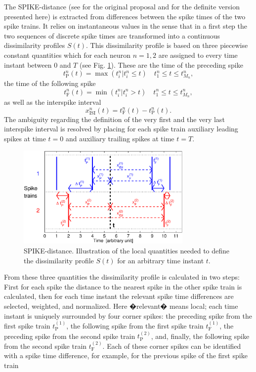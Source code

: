 \documentclass[10pt,twocolumn]{elsart5p}
\begin{document}
The SPIKE-distance (see \citet{Kreuz11} for the original proposal and \citet{Kreuz13} for the definite version presented here) is extracted from differences between the spike times of the two spike trains. It relies on instantaneous values in the sense that in a first step the two sequences of discrete spike times are transformed into a continuous dissimilarity profiles $S (t)$. This dissimilarity profile is based on three piecewise constant quantities which for each neuron $n = 1, 2$ are assigned to every time instant between $0$ and $T$ (see Fig. \ref{fig:Fig1-SPIKE-Illustration}). These are the time of the preceding spike
%
\begin{equation} \label{eq:Prev-Spike}
    t_{\mathrm {P}}^n (t) = \max(t_i^n | t_i^n \leq t)  \quad t_1^n \leq t \leq t_{M_n}^n,
\end{equation}
%
the time of the following spike
%
\begin{equation} \label{eq:Foll-Spike}
    t_{\mathrm {F}}^n (t) = \min(t_i^n | t_i^n > t)  \quad t_1^n \leq t \leq t_{M_n}^n,
\end{equation}
%
as well as the interspike interval
%
\begin{equation} \label{eq:ISI}
    x_{\mathrm {ISI}}^n (t) = t_{\mathrm {F}}^n (t) - t_{\mathrm {P}}^n (t).
\end{equation}
%
The ambiguity regarding the definition of the very first and the very last interspike interval is resolved by placing for each spike train auxiliary leading spikes at time $t = 0$ and auxiliary trailing spikes at time $t = T$.
%
\begin{figure}
    \includegraphics[width=85mm]{Fig1_SPIKE_Illustration.eps}
    \caption{\abb\label{fig:Fig1-SPIKE-Illustration} SPIKE-distance. Illustration of the local quantities needed to define the dissimilarity profile $S (t)$ for an arbitrary time instant $t$.}
\end{figure}
%
From these three quantities the dissimilarity profile is calculated in two steps: First for each spike the distance to the nearest spike in the other spike train is calculated, then for each time instant the relevant spike time differences are selected, weighted, and normalized. Here �relevant� means local; each time instant is uniquely surrounded by four corner spikes: the preceding spike from the first spike train $t_{\mathrm {P}}^{(1)}$, the following spike from the first spike train $t_{\mathrm {F}}^{(1)}$, the preceding spike from the second spike train $t_{\mathrm {P}}^{(2)}$, and, finally, the following spike from the second spike train $t_{\mathrm {F}}^{(2)}$. Each of these corner spikes can be identified with a spike time difference, for example, for the previous spike of the first spike train
\end{document}
